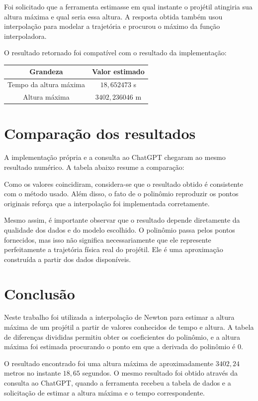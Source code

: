 \documentclass[12pt,brazil,a4paper, twocolumn]{article}
\begin{document}
Foi solicitado que a ferramenta estimasse em qual instante o projétil atingiria sua altura máxima e qual seria essa altura. A resposta obtida também usou interpolação para modelar a trajetória e procurou o máximo da função interpoladora.

O resultado retornado foi compatível com o resultado da implementação:

\begin{center}
\begin{tabular}{c|c}
Grandeza & Valor estimado\\
\hline
Tempo da altura máxima & $18,652473$ s\\
Altura máxima & $3402,236046$ m\\
\end{tabular}
\end{center}

\section{Comparação dos resultados}

A implementação própria e a consulta ao ChatGPT chegaram ao mesmo resultado numérico. A tabela abaixo resume a comparação:

\begin{center}
\end{center}

Como os valores coincidiram, considera-se que o resultado obtido é consistente com o método usado. Além disso, o fato de o polinômio reproduzir os pontos originais reforça que a interpolação foi implementada corretamente.

Mesmo assim, é importante observar que o resultado depende diretamente da qualidade dos dados e do modelo escolhido. O polinômio passa pelos pontos fornecidos, mas isso não significa necessariamente que ele represente perfeitamente a trajetória física real do projétil. Ele é uma aproximação construída a partir dos dados disponíveis.

\section{Conclusão}

Neste trabalho foi utilizada a interpolação de Newton para estimar a altura máxima de um projétil a partir de valores conhecidos de tempo e altura. A tabela de diferenças divididas permitiu obter os coeficientes do polinômio, e a altura máxima foi estimada procurando o ponto em que a derivada do polinômio é $0$.

O resultado encontrado foi uma altura máxima de aproximadamente $3402,24$ metros no instante $18,65$ segundos. O mesmo resultado foi obtido através da consulta ao ChatGPT, quando a ferramenta recebeu a tabela de dados e a solicitação de estimar a altura máxima e o tempo correspondente.
\end{document}
